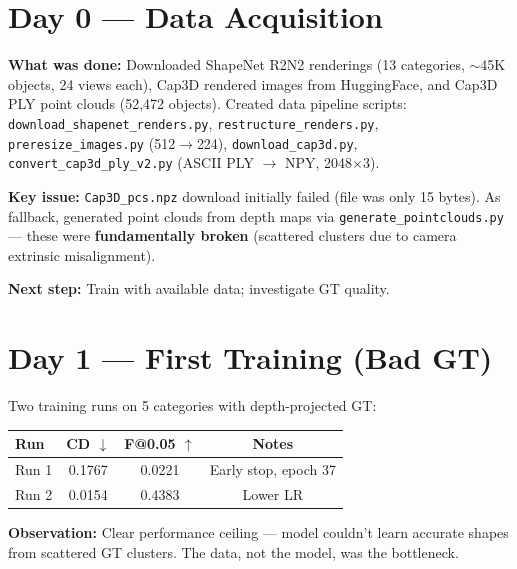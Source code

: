 \documentclass[10pt,twocolumn,letterpaper]{article}
\begin{document}
\section{Day 0 --- Data Acquisition}

\textbf{What was done:} Downloaded ShapeNet R2N2 renderings (13 categories, $\sim$45K objects, 24 views each), Cap3D rendered images from HuggingFace, and Cap3D PLY point clouds (52,472 objects). Created data pipeline scripts: \texttt{download\_shapenet\_renders.py}, \texttt{restructure\_renders.py}, \texttt{preresize\_images.py} (512$\to$224), \texttt{download\_cap3d.py}, \texttt{convert\_cap3d\_ply\_v2.py} (ASCII PLY $\to$ NPY, 2048$\times$3).

\textbf{Key issue:} \texttt{Cap3D\_pcs.npz} download initially failed (file was only 15 bytes). As fallback, generated point clouds from depth maps via \texttt{generate\_pointclouds.py} --- these were \textbf{fundamentally broken} (scattered clusters due to camera extrinsic misalignment).

\textbf{Next step:} Train with available data; investigate GT quality.

\section{Day 1 --- First Training (Bad GT)}

Two training runs on 5 categories with depth-projected GT:

\begin{table}[h]
\centering
\scriptsize
\begin{tabular}{@{}lccc@{}}
\toprule
\textbf{Run} & \textbf{CD $\downarrow$} & \textbf{F@0.05 $\uparrow$} & \textbf{Notes} \\
\midrule
Run 1 & 0.1767 & 0.0221 & Early stop, epoch 37 \\
Run 2 & 0.0154 & 0.4383 & Lower LR \\
\bottomrule
\end{tabular}
\end{table}

\textbf{Observation:} Clear performance ceiling --- model couldn't learn accurate shapes from scattered GT clusters. The data, not the model, was the bottleneck.
\end{document}
